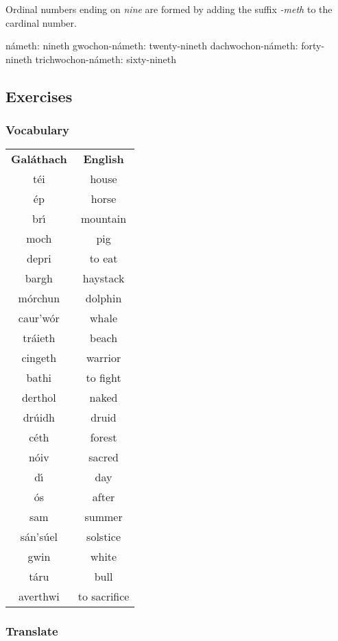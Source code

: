 Ordinal numbers ending on \textit{nine} are formed by adding the suffix \textit{-meth} to the cardinal number.

n\'{a}meth: nineth
gwochon-n\'{a}meth: twenty-nineth
dachwochon-n\'{a}meth: forty-nineth
trichwochon-n\'{a}meth: sixty-nineth

\subsection{Exercises}

\subsubsection{Vocabulary}

\begin{table}[H]
\centering
\begin{tabular}{cc}
  \toprule
  \textbf{Gal\'{a}thach} & \textbf{English}\\
  t\'{e}i & house\\
  \'{e}p & horse\\
  br\'{\i} & mountain\\
  moch & pig\\
  depri & to eat\\
  bargh & haystack\\
  m\'{o}rchun & dolphin\\
  caur'w\'{o}r & whale\\
  tr\'{a}ieth & beach\\
  cingeth & warrior\\
  bathi & to fight\\
  derthol & naked\\
  dr\'{u}idh & druid\\
  c\'{e}th & forest\\
  n\'{o}iv & sacred\\
  d\'{\i} & day\\
  \'{o}s & after\\
  sam & summer\\
  s\'{a}n's\'{u}el & solstice\\
  gwin & white\\
  t\'{a}ru & bull\\
  averthwi & to sacrifice\\
  \bottomrule
\end{tabular}
\label{vocab_exercise_lesson17}
\end{table}
 
\subsubsection{Translate}


